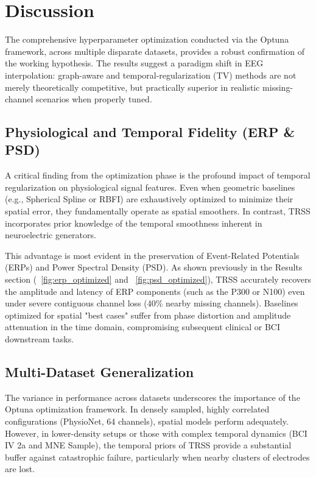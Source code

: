 \section{Discussion}

The comprehensive hyperparameter optimization conducted via the Optuna framework, across multiple disparate datasets, provides a robust confirmation of the working hypothesis. The results suggest a paradigm shift in EEG interpolation: graph-aware and temporal-regularization (TV) methods are not merely theoretically competitive, but practically superior in realistic missing-channel scenarios when properly tuned.

\subsection{Physiological and Temporal Fidelity (ERP \& PSD)}
A critical finding from the optimization phase is the profound impact of temporal regularization on physiological signal features. Even when geometric baselines (e.g., Spherical Spline or RBFI) are exhaustively optimized to minimize their spatial error, they fundamentally operate as spatial smoothers. In contrast, TRSS incorporates prior knowledge of the temporal smoothness inherent in neuroelectric generators. 

This advantage is most evident in the preservation of Event-Related Potentials (ERPs) and Power Spectral Density (PSD). As shown previously in the Results section (\figurename~\ref{fig:erp_optimized} and \figurename~\ref{fig:psd_optimized}), TRSS accurately recovers the amplitude and latency of ERP components (such as the P300 or N100) even under severe contiguous channel loss (40\% nearby missing channels). Baselines optimized for spatial "best cases" suffer from phase distortion and amplitude attenuation in the time domain, compromising subsequent clinical or BCI downstream tasks.

\subsection{Multi-Dataset Generalization}
The variance in performance across datasets underscores the importance of the Optuna optimization framework. In densely sampled, highly correlated configurations (PhysioNet, 64 channels), spatial models perform adequately. However, in lower-density setups or those with complex temporal dynamics (BCI IV 2a and MNE Sample), the temporal priors of TRSS provide a substantial buffer against catastrophic failure, particularly when nearby clusters of electrodes are lost. 

